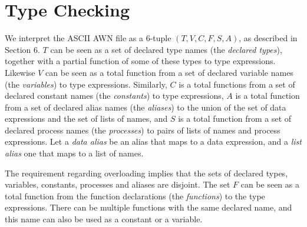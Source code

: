 \documentclass[adraft]{eptcs}
\begin{document}
\section{Type Checking}\label{sec:type checking}

  We interpret the ASCII AWN file as a 6-tuple $(T,V,C,F,S,A)$, as described in Section 6.
  $T$ can be seen as a set of declared type names (the \emph{declared types}), together with a
  partial function of some of these types to type expressions. 
  Likewise $V$ can be seen as a total function from a set of declared variable names (the \emph{variables})
  to type expressions. Similarly, $C$ is a total functions from a set of declared constant names
  (the \emph{constants}) to type expressions, $A$ is a total function from a set of declared alias names
  (the \emph{aliases}) to the union of the set of data expressions and the set of lists of names,
  and $S$ is a total function from a set of declared process names (the \emph{processes}) to pairs
  of lists of names and process expressions. Let a \emph{data alias} be an alias that maps to a data
  expression, and a \emph{list alias} one that maps to a list of names.

  The requirement regarding overloading implies that the
  sets of declared types, variables, constants, processes and aliases are disjoint.
  The set $F$ can be seen as a total function from the function declarations (the \emph{functions})
  to the type expressions. There can be multiple functions with the same declared name, and this
  name can also be used as a constant or a variable.
\end{document}
